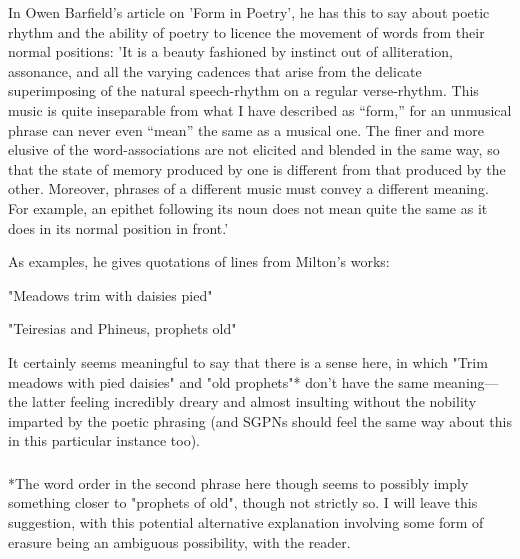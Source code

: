 \documentclass[]{article}
\begin{document}
In Owen Barfield's article on 'Form in Poetry', he has this to say about poetic rhythm and the ability of poetry to licence the movement of words from their normal positions: 'It is a beauty fashioned by instinct out of alliteration, assonance, and all the varying cadences that arise from the delicate superimposing of the natural speech-rhythm on a regular verse-rhythm. This music is quite inseparable from what I have described as “form,” for an unmusical phrase can never even “mean” the same as a musical one. The finer and more elusive of the word-associations are not elicited and blended in the same way, so that the state of memory produced by one is different from that produced by the other. Moreover, phrases of a different music must convey a different meaning. For example, an epithet following its noun does not mean quite the same as it does in its normal position in front.'



As examples, he gives quotations of lines from Milton's works:

"Meadows trim with daisies pied"



"Teiresias and Phineus, prophets old"



It certainly seems meaningful to say that there is a sense here, in which "Trim meadows with pied daisies" and "old prophets"* don't have the same meaning—the latter feeling incredibly dreary and almost insulting without the nobility imparted by the poetic phrasing (and SGPNs should feel the same way about this in this particular instance too).



\subsubsection{}



*The word order in the second phrase here though seems to possibly imply something closer to "prophets of old", though not strictly so. I will leave this suggestion, with this potential alternative explanation involving some form of erasure being an ambiguous possibility, with the reader.



\section{}
\end{document}

